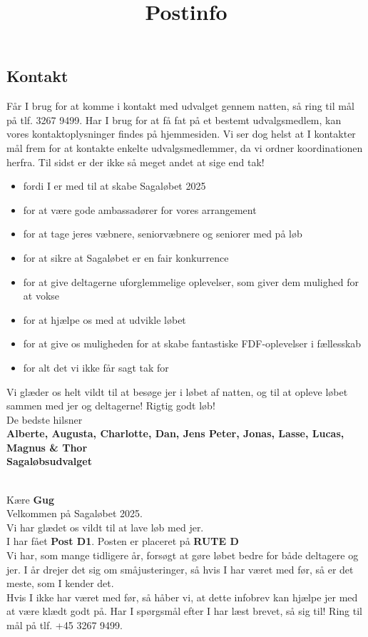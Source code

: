 \subsection{Kontakt}
Får I brug for at komme i kontakt med udvalget gennem natten, så ring til mål på tlf. 3267 9499. Har I brug for at få fat på et bestemt udvalgsmedlem, kan vores kontaktoplysninger findes på hjemmesiden. Vi ser dog helst at I kontakter mål frem for at kontakte enkelte udvalgsmedlemmer, da vi ordner koordinationen herfra.
\newline
Til sidst er der ikke så meget andet at sige end tak!\begin{itemize}
  \item fordi I er med til at skabe Sagaløbet 2025
  \item for at være gode ambassadører for vores arrangement
  \item for at tage jeres væbnere, seniorvæbnere og seniorer med på løb
  \item for at sikre at Sagaløbet er en fair konkurrence
  \item for at give deltagerne uforglemmelige oplevelser, som giver dem mulighed for at vokse
  \item for at hjælpe os med at udvikle løbet
  \item for at give os muligheden for at skabe fantastiske FDF-oplevelser i fællesskab
  \item for alt det vi ikke får sagt tak for
\end{itemize}
Vi glæder os helt vildt til at besøge jer i løbet af natten, og til at opleve løbet sammen med jer og deltagerne!
\newline
Rigtig godt løb!\\
\newline
\textcolor{søblå}{De bedste hilsner}\\
\textcolor{natblå}{\textbf{Alberte, Augusta, Charlotte, Dan, Jens Peter, Jonas, Lasse, Lucas, Magnus \& Thor}}\\
\textcolor{natblå}{\textbf{Sagaløbsudvalget}}\\
\newpage
\title{Postinfo}\\
Kære \textbf{Gug}\\
\newline
Velkommen på Sagaløbet 2025.\\
Vi har glædet os vildt til at lave løb med jer.\\
\newline
I har fået \textbf{Post D1}. Posten er placeret på \textbf{RUTE D}\\
Vi har, som mange tidligere år, forsøgt at gøre løbet bedre for både deltagere og jer. I år drejer det sig om småjusteringer, så hvis I har været med før, så er det meste, som I kender det.\\
\newline
Hvis I ikke har været med før, så håber vi, at dette infobrev kan hjælpe jer med at være klædt godt på. Har I spørgsmål efter I har læst brevet, så sig til! Ring til mål på tlf. +45 3267 9499.
